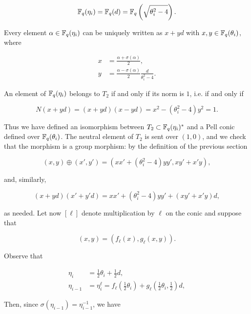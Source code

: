 \documentclass[11pt]{article}
\begin{document}
\begin{equation}
  \mathbb{F}_q(\eta_i) = \mathbb{F}_q(d) = \mathbb{F}_q\left(\sqrt{\theta_i^2-4}\right).
\end{equation}

Every element $\alpha\in\mathbb{F}_q(\eta_i)$ can be uniquely written as
$x + yd$ with $x,y\in\mathbb{F}_q(\theta_i)$, where

\begin{align}
  x &= \frac{\alpha + \sigma(\alpha)}{2},\\
  y &= \frac{\alpha - \sigma(\alpha)}{2}\frac{d}{\theta_i^2-4}.
\end{align}
    
An element of $\mathbb{F}_q(\eta_i)$ belongs to $T_2$ if and only if its norm
is $1$, i.e. if and only if

\begin{equation}
  N(x + yd) = (x + yd)(x - yd) = x^2 - (\theta_i^2-4)y^2 = 1.
\end{equation}

Thus we have defined an isomorphism between
$T_2\subset\mathbb{F}_q(\eta_i)^\ast$ and a Pell conic defined over
$\mathbb{F}_q(\theta_i)$. The neutral element of $T_2$ is sent over $(1,0)$,
and we check that the morphism is a group morphism: by the definition
of the previous section

\begin{equation}
  (x,y) \oplus (x',y') = (xx' + (\theta_i^2-4)yy', xy' + x'y),
\end{equation}

and, similarly,

\begin{equation}
  (x + yd)(x' + y'd) = xx' + (\theta_i^2 - 4)yy' + (xy' + x'y)d,
\end{equation}

as needed. Let now $[\ell]$ denote multiplication by $\ell$ on the
conic and suppose that

\begin{equation}
  [\ell](x,y) = \left(f_\ell(x), g_\ell(x, y)\right).
\end{equation}

Observe that

\begin{align}
  \eta_i &= \frac{1}{2}\theta_i + \frac{1}{2}d,\\
  \eta_{i-1} &= \eta_i^\ell = f_\ell\left(\frac{1}{2}\theta_i\right) + g_\ell\left(\frac{1}{2}\theta_i, \frac{1}{2}\right)d,
\end{align}
    
Then, since $\sigma(\eta_{i-1}) = \eta_{i-1}^{-1}$, we have
\end{document}
